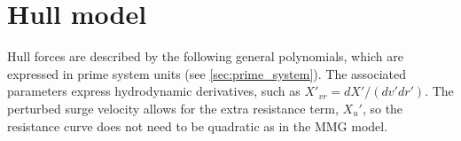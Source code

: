 \section{Hull model} \label{sec:hull}
Hull forces are described by the following general polynomials, which are expressed in prime system units (see \autoref{sec:prime_system}). The associated parameters express hydrodynamic derivatives, such as ${X}'_{vr}=dX'/(dv'dr')$.
The perturbed surge velocity allows for the extra resistance term, ${X_u}'$, so the resistance curve does not need to be quadratic as in the MMG model.  
\begin{equation}
    \label{eq:X_H}
    
\end{equation}
%
\begin{equation}
    \label{eq:Y_H}
    
\end{equation}
%
\begin{equation}
    \label{eq:N_H}
    
\end{equation}